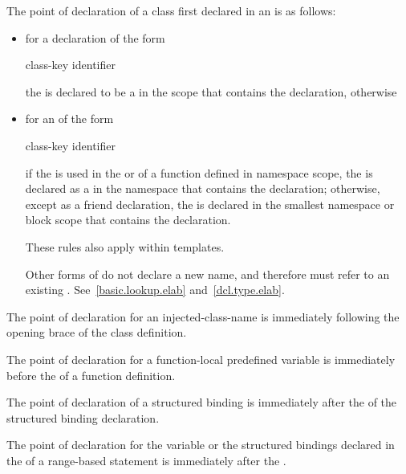 \pnum
The point of declaration of a class first declared in an
 is as follows:
\begin{itemize}
\item for a declaration of the form

\begin{ncbnf}
class-key  identifier \terminal{;}
\end{ncbnf}

the  is declared to be a
 in the scope that contains the declaration,
otherwise
\item for an  of the form

\begin{ncbnf}
class-key identifier
\end{ncbnf}

if the
 is used in the
 or 
of a function defined in namespace scope, the  is
declared as a  in the namespace that contains the
declaration; otherwise, except as a friend declaration, the
 is declared in the smallest namespace or block
scope that contains the declaration. \begin{note}
These rules also apply within templates. \end{note} \begin{note} Other
forms of  do not declare a new name,
and therefore must refer to an existing .
See~\ref{basic.lookup.elab} and~\ref{dcl.type.elab}. \end{note}
\end{itemize}

\pnum
The point of declaration for an
injected-class-name is immediately following
the opening brace of the class definition.

\pnum
The point of declaration for a function-local predefined
variable is immediately before the
 of a function definition.

\pnum
The point of declaration of a structured binding
is immediately after
the  of the structured binding declaration.

\pnum
The point of declaration for the variable or the structured bindings
declared in the 
of a range-based  statement
is immediately after the .

